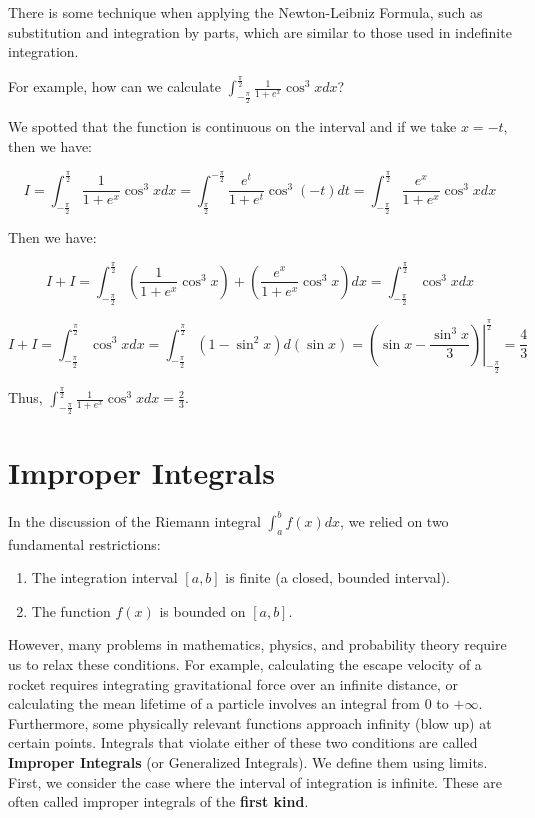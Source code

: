 \documentclass[oneside]{book}
\begin{document}
There is some technique when applying the Newton-Leibniz Formula, such as substitution and integration by parts, which are similar to those used in indefinite integration.

For example, how can we calculate $\int_{-\frac{\pi}{2}}^{\frac{\pi}{2}} \frac{1}{1+e^x} \cos^3 x dx$?

We spotted that the function is continuous on the interval and if we take $x = -t$, then we have:

\[
I = \int_{-\frac{\pi}{2}}^{\frac{\pi}{2}} \frac{1}{1+e^x} \cos^3 x dx = \int_{\frac{\pi}{2}}^{-\frac{\pi}{2}} \frac{e^t}{1+e^t} \cos^3 (-t) dt = \int_{-\frac{\pi}{2}}^{\frac{\pi}{2}} \frac{e^x}{1+e^x} \cos^3 x dx
\]

Then we have:

\[
I + I = \int_{-\frac{\pi}{2}}^{\frac{\pi}{2}} (\frac{1}{1+e^x} \cos^3 x)+(\frac{e^x}{1+e^x} \cos^3 x) dx = \int_{-\frac{\pi}{2}}^{\frac{\pi}{2}} \cos^3 x dx
\]

\[
I + I = \int_{-\frac{\pi}{2}}^{\frac{\pi}{2}} \cos^3 x dx = \int_{-\frac{\pi}{2}}^{\frac{\pi}{2}} (1-\sin^2 x) d(\sin x) = \left. (\sin x - \frac{\sin^3 x}{3}) \right|_{-\frac{\pi}{2}}^{\frac{\pi}{2}} = \frac{4}{3} 
\]

Thus, $\int_{-\frac{\pi}{2}}^{\frac{\pi}{2}} \frac{1}{1+e^x} \cos^3 x dx = \frac{2}{3}$.

\section{Improper Integrals}
In the discussion of the Riemann integral $\int_a^b f(x) dx$, we relied on two fundamental restrictions:

\begin{enumerate}
    \item The integration interval $[a,b]$ is finite (a closed, bounded interval).
    \item The function $f(x)$ is bounded on $[a,b]$.
\end{enumerate}

However, many problems in mathematics, physics, and probability theory require us to relax these conditions. For example, calculating the escape velocity of a rocket requires integrating gravitational force over an infinite distance, or calculating the mean lifetime of a particle involves an integral from $0$ to $+\infty$. Furthermore, some physically relevant functions approach infinity (blow up) at certain points.
Integrals that violate either of these two conditions are called \textbf{Improper Integrals} (or Generalized Integrals). We define them using limits.
First, we consider the case where the interval of integration is infinite. These are often called improper integrals of the \textbf{first kind}.
\end{document}
